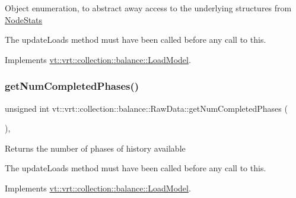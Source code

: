 Object enumeration, to abstract away access to the underlying structures from \hyperlink{structvt_1_1vrt_1_1collection_1_1balance_1_1_node_stats}{Node\+Stats}

The {\ttfamily update\+Loads} method must have been called before any call to this. 

Implements \hyperlink{structvt_1_1vrt_1_1collection_1_1balance_1_1_load_model_a6ca139b4f14d79d1d59b46016efae221}{vt\+::vrt\+::collection\+::balance\+::\+Load\+Model}.

\mbox{\label{structvt_1_1vrt_1_1collection_1_1balance_1_1_raw_data_a151f3230094feacd15015f51980b8e9e}} 
\subsubsection{\texorpdfstring{get\+Num\+Completed\+Phases()}{getNumCompletedPhases()}}
{\footnotesize\ttfamily unsigned int vt\+::vrt\+::collection\+::balance\+::\+Raw\+Data\+::get\+Num\+Completed\+Phases (\begin{DoxyParamCaption}{ }\end{DoxyParamCaption})\hspace{0.3cm}{\ttfamily [override]}, {\ttfamily [virtual]}}

Returns the number of phases of history available

The {\ttfamily update\+Loads} method must have been called before any call to this. 

Implements \hyperlink{structvt_1_1vrt_1_1collection_1_1balance_1_1_load_model_a999b155237ce8ba253019e783462a9aa}{vt\+::vrt\+::collection\+::balance\+::\+Load\+Model}.

\mbox{\label{structvt_1_1vrt_1_1collection_1_1balance_1_1_raw_data_a586c3223d1f69ee9d5eb2930ff659051}} 
